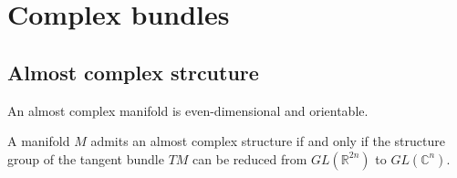 \section{Complex bundles}

\subsection{Almost complex strcuture}

	
	\begin{property}
		An almost complex manifold is even-dimensional and orientable.
	\end{property}
	
	\begin{property}
		A manifold $M$ admits an almost complex structure if and only if the structure group of the tangent bundle $TM$ can be reduced from $GL(\mathbb{R}^{2n})$ to $GL(\mathbb{C}^n)$.
	\end{property}
